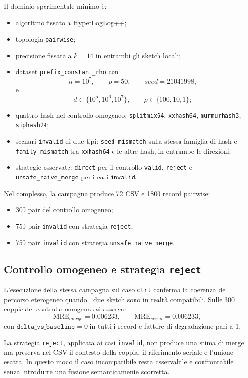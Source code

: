 Il dominio sperimentale minimo è:
\begin{itemize}
    \item algoritmo fissato a HyperLogLog++;
    \item topologia \texttt{pairwise};
    \item precisione fissata a \(k=14\) in entrambi gli sketch locali;
    \item dataset \texttt{prefix\_constant\_rho} con
    \[
    n = 10^7,\qquad p = 50,\qquad seed = 21041998,
    \]
    e
    \[
    d \in \{10^5,10^6,10^7\},\qquad \rho \in \{100,10,1\};
    \]
    \item quattro hash nel controllo omogeneo:
    \texttt{splitmix64}, \texttt{xxhash64}, \texttt{murmurhash3},
    \texttt{siphash24};
    \item scenari \texttt{invalid} di due tipi:
    \texttt{seed mismatch} sulla stessa famiglia di hash e
    \texttt{family mismatch} tra \texttt{xxhash64} e le altre hash, in entrambe
    le direzioni;
    \item strategie osservate:
    \texttt{direct} per il controllo \texttt{valid},
    \texttt{reject} e \texttt{unsafe\_naive\_merge} per i casi
    \texttt{invalid}.
\end{itemize}

Nel complesso, la campagna produce 72 CSV e 1800 record pairwise:
\begin{itemize}
    \item 300 pair del controllo omogeneo;
    \item 750 pair \texttt{invalid} con strategia \texttt{reject};
    \item 750 pair \texttt{invalid} con strategia \texttt{unsafe\_naive\_merge}.
\end{itemize}

\subsection{Controllo omogeneo e strategia \texttt{reject}}

L'esecuzione della stessa campagna sul caso \texttt{ctrl} conferma la coerenza
del percorso eterogeneo quando i due sketch sono in realtà compatibili. Sulle
300 coppie del controllo omogeneo si osserva:
\[
\mathrm{MRE}_{merge} = 0.006233,\qquad
\mathrm{MRE}_{serial} = 0.006233,
\]
con \(\texttt{delta\_vs\_baseline}=0\) in tutti i record e fattore di
degradazione pari a 1.

La strategia \texttt{reject}, applicata ai casi \texttt{invalid}, non produce
una stima di merge ma preserva nel CSV il contesto della coppia, il riferimento
seriale e l'unione esatta. In questo modo il caso incompatibile resta
osservabile e confrontabile senza introdurre una fusione semanticamente
scorretta.

